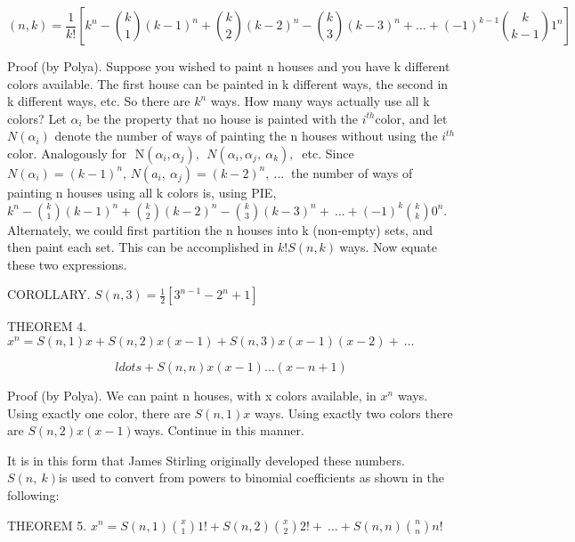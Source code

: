 \documentclass[10pt,letter]{article}
\begin{document}
\[
\left( n,k \right) = \frac{1}{k!}\left\lbrack k^{n} - \binom{k}{1} \left( k - 1 \right)^{n} + \binom{k}{2} \left( k - 2 \right)^{n} - \binom{k}{3} \left( k - 3 \right)^{n} + \ldots + \left( - 1 \right)^{k - 1}\binom{k}{k - 1} 1^{n} \right\rbrack
\]

Proof (by Polya). Suppose you wished to paint n houses and you have k
different colors available. The first house can be painted in k
different ways, the second in k different ways, etc. So there are
\(k^{n}\) ways. How many ways actually use all k colors? Let
\(\alpha_{i}\) be the property that no house is painted with the
\(i^{th}\)color, and let \(N(\alpha_{i})\) denote the number of ways of
painting the n houses without using the \(i^{th}\)color. Analogously for
\(\text{\ N}\left( \alpha_{i},\alpha_{j} \right),\ \ N\left( \alpha_{i},\alpha_{j},\ \alpha_{k} \right),\ \)
etc. Since \(N\left( \alpha_{i} \right) = \left( k - 1 \right)^{n}\),
\(N\left( a_{i},\ \alpha_{j} \right) = \left( k - 2 \right)^{n},\ \ldots\ \)
the number of ways of painting n houses using all k colors is, using
PIE, \(k^{n} -\binom{k}{1}
\left( k - 1 \right)^{n} +
\binom{k}{2}
\left( k - 2 \right)^{n} -
\binom{k}{3}
\left( k - 3 \right)^{n} + \ \ldots + \left( - 1 \right)^{k}
\binom{k}{k}
0^{n}\). Alternately, we could first partition the n houses
into k (non-empty) sets, and then paint each set. This can be
accomplished in \(k!S\left( n,k \right)\ \)ways. Now equate these two
expressions.

COROLLARY.
\(S\left( n,3 \right) = \frac{1}{2}\left\lbrack 3^{n - 1} - 2^{n} + 1 \right\rbrack\)

THEOREM 4.
\(x^{n} = S\left( n,1 \right)x + S\left( n,2 \right)x\left( x - 1 \right) + S\left( n,3 \right)x\left( x - 1 \right)\left( x - 2 \right) + \ \ldots\ \)

\[
ldots + S\left( n,n \right)x\left( x - 1 \right)\ldots(x - n + 1)
\]

Proof (by Polya). We can paint n houses, with x colors available, in
\(x^{n}\) ways. Using exactly one color, there are
\(S\left( n,1 \right)x\) ways. Using exactly two colors there are
\(S\left( n,2 \right)x(x - 1)\)ways. Continue in this manner.

It is in this form that James Stirling originally developed these
numbers. \(S(n,\ k)\)is used to convert from powers to binomial
coefficients as shown in the following:

THEOREM 5. \(x^{n} = S\left( n,1 \right)
\binom{x}{1}
1! + S\left( n,2 \right)
\binom{x}{2}
2! + \ \ldots + S\left( n,n \right)
\binom{n}{n}
n!\ \)
\end{document}
